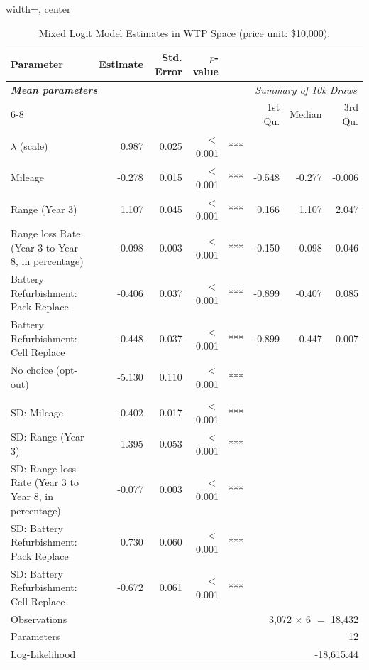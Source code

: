 \begin{table}[pos=H]
\selectfont
\caption{Mixed Logit Model Estimates in WTP Space (price unit: \$10,000).}
\label{table:mxl_results}
\begin{adjustbox}{width=\textwidth, center}

\begin{tabular}{lrrrlrrr}
\toprule
Parameter & Estimate & Std. Error & $p$-value &  &  &  & \\
\midrule
\multicolumn{5}{l}{\textbf{\textit{Mean parameters}}} & \multicolumn{3}{c}{\textit{Summary of 10k Draws}}\\
\cmidrule(l){6-8}
 & & & & & 1st Qu. & Median & 3rd Qu.\\[1.5ex]
$\lambda$ (scale) & 0.987 & 0.025 & $<$0.001 & *** &  &  & \\
Mileage & -0.278 & 0.015 & $<$0.001 & *** & -0.548 & -0.277 & -0.006\\
Range (Year 3) & 1.107 & 0.045 & $<$0.001 & *** & 0.166 & 1.107 & 2.047\\
Range loss Rate (Year 3 to Year 8, in percentage) & -0.098 & 0.003 & $<$0.001 & *** & -0.150 & -0.098 & -0.046\\
Battery Refurbishment: Pack Replace & -0.406 & 0.037 & $<$0.001 & *** & -0.899 & -0.407 & 0.085\\
Battery Refurbishment: Cell Replace & -0.448 & 0.037 & $<$0.001 & *** & -0.899 & -0.447 & 0.007\\
No choice (opt-out) & -5.130 & 0.110 & $<$0.001 & *** &  &  & \\
\addlinespace[1.5ex]\multicolumn{8}{l}{\textbf{\textit{Standard deviation}}}\\[1.5ex]
SD: Mileage & -0.402 & 0.017 & $<$0.001 & *** &  &  & \\
SD: Range (Year 3) & 1.395 & 0.053 & $<$0.001 & *** &  &  & \\
SD: Range loss Rate (Year 3 to Year 8, in percentage) & -0.077 & 0.003 & $<$0.001 & *** &  &  & \\
SD: Battery Refurbishment: Pack Replace & 0.730 & 0.060 & $<$0.001 & *** &  &  & \\
SD: Battery Refurbishment: Cell Replace & -0.672 & 0.061 & $<$0.001 & *** &  &  & \\
\midrule
\multicolumn{4}{l}{Observations} & \multicolumn{4}{r}{3,072 $\times$ 6 $=$ 18,432}\\
\multicolumn{4}{l}{Parameters} & \multicolumn{4}{r}{12}\\
\multicolumn{4}{l}{Log-Likelihood} & \multicolumn{4}{r}{-18,615.44}\\

\end{tabular}
\end{adjustbox}
\end{table}
